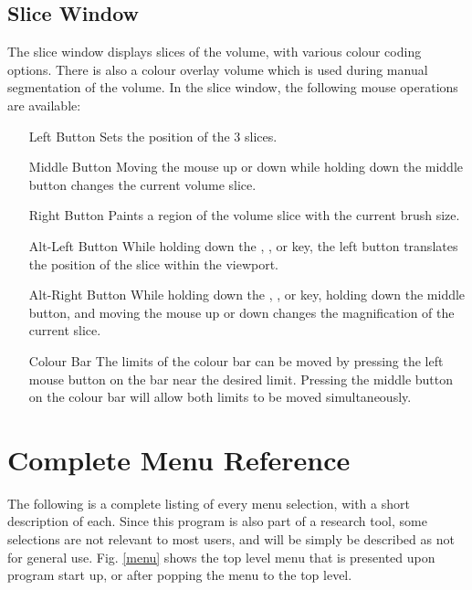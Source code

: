 \subsection{Slice Window}

The slice window displays slices of the volume, with various colour coding
options.  There is also a colour overlay volume which is used during
manual segmentation of the volume.
In the slice window, the following mouse operations are available:

\begin{itemize}
\item[Left Button]  Sets the position of the 3 slices.
\item[Middle Button]  Moving the mouse up or down while holding down the
                      middle button changes the current volume slice.
\item[Right Button]  Paints a region of the volume slice with the current
                     brush size.
\item[Alt-Left Button]  While holding down the , ,
                        or  key, the left button translates the
                        position of the slice within the viewport.
\item[Alt-Right Button]  While holding down the , ,
                        or  key, holding down the middle button,
                        and moving the mouse up or down changes the
                        magnification of the current slice.
\item[Colour Bar]  The limits of the colour bar can be moved by pressing
                   the left mouse button on the bar near the desired limit.
                   Pressing the middle button on the colour bar will allow
                   both limits to be moved simultaneously.
\end{itemize}

\section{Complete Menu Reference}

The following is a complete listing of every menu selection, with a
short description of each.
Since this program is also part of a research tool, some selections are
not relevant to most users, and will be simply be described as not for general
use.  Fig. \ref{menu} shows the top level menu that is presented upon
program start up, or after popping the menu to the top level.

